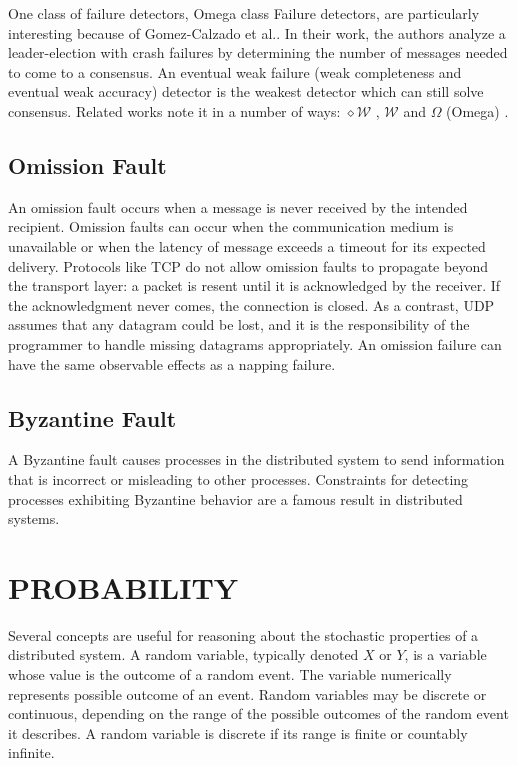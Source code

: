 One class of failure detectors, Omega class Failure detectors, are particularly interesting because of Gomez-Calzado et al.\cite{LEADERELECTIONEVAL}.
In their work, the authors analyze a leader-election with crash failures by determining the number of messages needed to come to a consensus.
An eventual weak failure (weak completeness and eventual weak accuracy) detector is the weakest detector which can still solve consensus. Related works note it in a number of ways: $\diamond \mathcal{W}$ \cite{FAILUREDETECTORS}, $\mathcal{W}$ \cite{WEAKESTFAILURE1} \cite{WEAKESTFAILURE2} and $\Omega$ (Omega) \cite{LEADERELECTIONEVAL}.

\subsection{Omission Fault}

An omission fault\cite{OMISSIONFAILURES} occurs when a message is never received by the intended recipient.
Omission faults can occur when the communication medium is unavailable or when the latency of message exceeds a timeout for its expected delivery.
Protocols like TCP do not allow omission faults to propagate beyond the transport layer: a packet is resent until it is acknowledged by the receiver\cite{computer-networking}.
If the acknowledgment never comes, the connection is closed.
As a contrast, UDP assumes that any datagram could be lost, and it is the responsibility of the programmer to handle missing datagrams appropriately.
An omission failure can have the same observable effects as a napping failure\cite{DISTRIBUTED}.

\subsection{Byzantine Fault}

A Byzantine fault causes processes in the distributed system to send information that is incorrect or misleading to other processes.
Constraints for detecting processes exhibiting Byzantine behavior are a famous result in distributed systems\cite{byzantine-generals}.

\section{PROBABILITY}

Several concepts are useful for reasoning about the stochastic properties of a distributed system.
A random variable, typically denoted $X$ or $Y$, is a variable whose value is the outcome of a random event.
The variable numerically represents possible outcome of an event.
Random variables may be discrete or continuous, depending on the range of the possible outcomes of the random event it describes.
A random variable is discrete if its range is finite or countably infinite.

